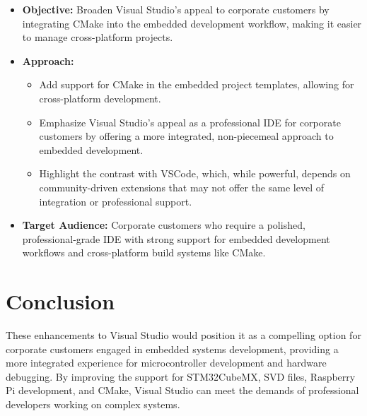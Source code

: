 \documentclass{article}
\begin{document}
\begin{itemize}
    \item \textbf{Objective:} Broaden Visual Studio's appeal to corporate customers by integrating CMake into the embedded development workflow, making it easier to manage cross-platform projects.
    \item \textbf{Approach:} 
    \begin{itemize}
        \item Add support for CMake in the embedded project templates, allowing for cross-platform development.
        \item Emphasize Visual Studio's appeal as a professional IDE for corporate customers by offering a more integrated, non-piecemeal approach to embedded development. 
        \item Highlight the contrast with VSCode, which, while powerful, depends on community-driven extensions that may not offer the same level of integration or professional support.
    \end{itemize}
    \item \textbf{Target Audience:} Corporate customers who require a polished, professional-grade IDE with strong support for embedded development workflows and cross-platform build systems like CMake.
\end{itemize}

\section*{Conclusion}

These enhancements to Visual Studio would position it as a compelling option for corporate customers engaged in embedded systems development, providing a more integrated experience for microcontroller development and hardware debugging. By improving the support for STM32CubeMX, SVD files, Raspberry Pi development, and CMake, Visual Studio can meet the demands of professional developers working on complex systems.
\end{document}
